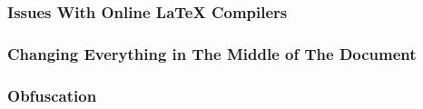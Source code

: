 \subsubsection{Issues With Online \LaTeX{} Compilers}
\subsubsection{Changing Everything in The Middle of The Document}
\subsubsection{Obfuscation}
